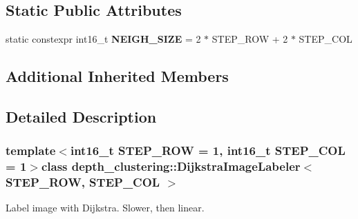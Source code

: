 \subsection*{Static Public Attributes}
\begin{DoxyCompactItemize}
\item 
\hypertarget{classdepth__clustering_1_1DijkstraImageLabeler_a3a1f1c3b1eac8cb71ff04b9d6cc58ea3}{static constexpr int16\-\_\-t {\bfseries N\-E\-I\-G\-H\-\_\-\-S\-I\-Z\-E} = 2 $\ast$ S\-T\-E\-P\-\_\-\-R\-O\-W + 2 $\ast$ S\-T\-E\-P\-\_\-\-C\-O\-L}\label{classdepth__clustering_1_1DijkstraImageLabeler_a3a1f1c3b1eac8cb71ff04b9d6cc58ea3}

\end{DoxyCompactItemize}
\subsection*{Additional Inherited Members}


\subsection{Detailed Description}
\subsubsection*{template$<$int16\-\_\-t S\-T\-E\-P\-\_\-\-R\-O\-W = 1, int16\-\_\-t S\-T\-E\-P\-\_\-\-C\-O\-L = 1$>$class depth\-\_\-clustering\-::\-Dijkstra\-Image\-Labeler$<$ S\-T\-E\-P\-\_\-\-R\-O\-W, S\-T\-E\-P\-\_\-\-C\-O\-L $>$}

Label image with Dijkstra. Slower, then linear. 

